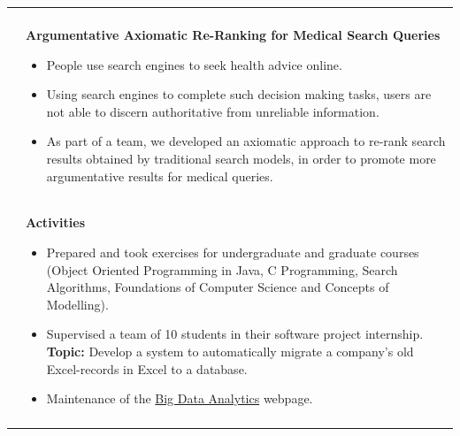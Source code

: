 \documentclass[a4paper,10pt]{article} %
\begin{document}
\begin{longtable}{l p{11cm}}
{  }
\\[-2mm]
& \textbf{\footnotesize{Argumentative Axiomatic Re-Ranking for Medical Search Queries}}\vspace{0.2em}
  {\footnotesize
  	\begin{itemize}
  		\setlength\itemsep{0.2em}
 		\item People use search engines to seek health advice online. 
		\item Using search engines to complete such decision making tasks, users are not able to discern authoritative from unreliable information.
		\item As part of a team, we developed an axiomatic approach to re-rank search results obtained by traditional search models, in order to promote more argumentative results for medical queries.   
  \end{itemize}
  }
\\[-2mm]
& \textbf{\footnotesize{Activities}}\vspace{0.2em}
  {\footnotesize
  	\begin{itemize}
  		\setlength\itemsep{0.2em}
 		\item Prepared and took exercises for undergraduate and graduate courses (Object Oriented Programming in Java, C Programming, Search Algorithms, Foundations of Computer Science and Concepts of Modelling).
 		\item Supervised a team of 10 students in their software project internship. \newline \textbf{Topic:} Develop a system to automatically migrate a company's old Excel-records in Excel to a database.
 		\item Maintenance of the \href{https://www.informatik.uni-halle.de/arbeitsgruppen/big_data_analytics/}{Big Data Analytics} webpage.    
  \end{itemize}
  }
\\
\multicolumn{2}{c}{} \\[-1.5em]


\end{longtable}
\end{document}
